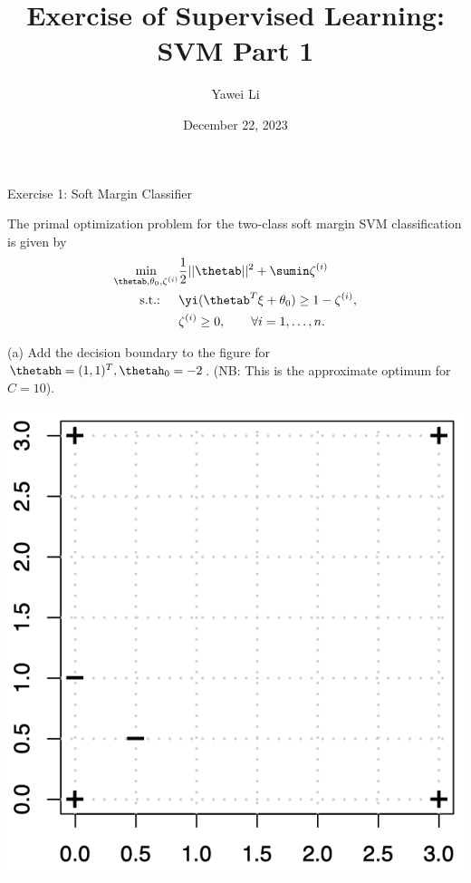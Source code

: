 \documentclass[aspectratio=169]{beamer}
\title[]{\textbf{Exercise of Supervised Learning: \\ SVM Part 1}}
\author{Yawei Li}
\institute[LMU]
{
\\
  \texttt{yawei.li@stat.uni-muenchen.de}
}
\date{December 22, 2023}
\newcommand{\zetai}{\zeta^{(i)}}
\begin{document}
\begin{frame}
\titlepage

\end{frame}

\begin{frame}{Exercise 1: Soft Margin Classifier}

The primal optimization problem for the two-class soft margin SVM classification is given by 
\begin{align*}
	\min_{\thetab, \theta_0, \zetai} & \frac{1}{2} ||\thetab||^2 + \sumin \zetai \\	
	\text{s.t.: }\quad & \yi (\thetab^T \xi + \theta_0) \geq 1 - \zetai, \\
	& \zetai \geq 0, \qquad \forall i= 1, \ldots, n.
\end{align*}

\begin{adjustbox}{valign=t}
	\begin{minipage}[t]{0.49\textwidth}
		(a) Add the decision boundary to the figure for $\thetabh = (1, 1)^T, \thetah_0 = -2$. (NB: This is the approximate optimum for $C = 10$).
	\end{minipage}
\end{adjustbox}
\hfill
\begin{adjustbox}{valign=t}
	\begin{minipage}{0.49\textwidth}
		\centering
		\includegraphics[width=0.6\columnwidth]{figures/ex_1_question.png}
	\end{minipage}

\end{adjustbox}

\end{frame}
\end{document}
